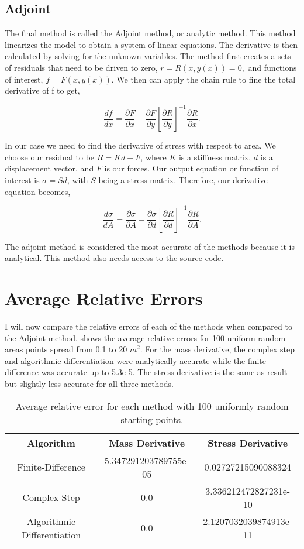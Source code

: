 \documentclass{article}
\begin{document}
\subsection*{Adjoint}

The final method is called the Adjoint method, or analytic method. This method linearizes the model to obtain a system of linear equations. The derivative is then calculated by solving for the unknown variables. The method first creates a sets of residuals that need to be driven to zero, $ r = R(x,y(x)) = 0,$ and functions of interest, $ f=F(x,y(x)). $ We then can apply the chain rule to fine the total derivative of f to get,

$$ \frac{df}{dx}=\frac{\partial F}{\partial x}-\frac{\partial F}{\partial y}\left[\frac{\partial R}{\partial y}\right]^{-1} \frac{\partial R}{\partial x}.$$

In our case we need to find the derivative of stress with respect to area. We choose our residual to be $R=Kd-F$, where $K$ is a stiffness matrix, $d$ is a displacement vector, and $F$ is our forces. Our output equation or function of interest is $\sigma=Sd$, with $S$ being a stress matrix. Therefore, our derivative equation becomes,

$$ \frac{d\sigma}{dA}=\frac{\partial \sigma}{\partial A}-\frac{\partial \sigma}{\partial d}\left[\frac{\partial R}{\partial d}\right]^{-1} \frac{\partial R}{\partial A}.$$

The adjoint method is considered the most accurate of the methods because it is analytical. This method also needs access to the source code.

\section*{Average Relative Errors}

I will now compare the relative errors of each of the methods when compared to the Adjoint method.  shows the average relative errors for 100 uniform random areas points spread from 0.1 to 20 $m^2$. For the mass derivative, the complex step and algorithmic differentiation were analytically accurate while the finite-difference was accurate up to 5.3e-5. The stress derivative is the same as result but slightly less accurate for all three methods. 

\begin{table}[htb]
	\centering
	\caption{Average relative error for each method with 100 uniformly random starting points.}
	\label{tab:comp_der}
	\begin{tabular}{c|c|c}
		\toprule
		Algorithm & Mass Derivative & Stress Derivative \\
		\midrule
		Finite-Difference & 5.347291203789755e-05 & 0.02727215090088324 \\
		Complex-Step  & 0.0 & 3.336212472827231e-10 \\
		Algorithmic Differentiation & 0.0 & 2.1207032039874913e-11 \\
		\bottomrule
	\end{tabular}
\end{table}
\end{document}
